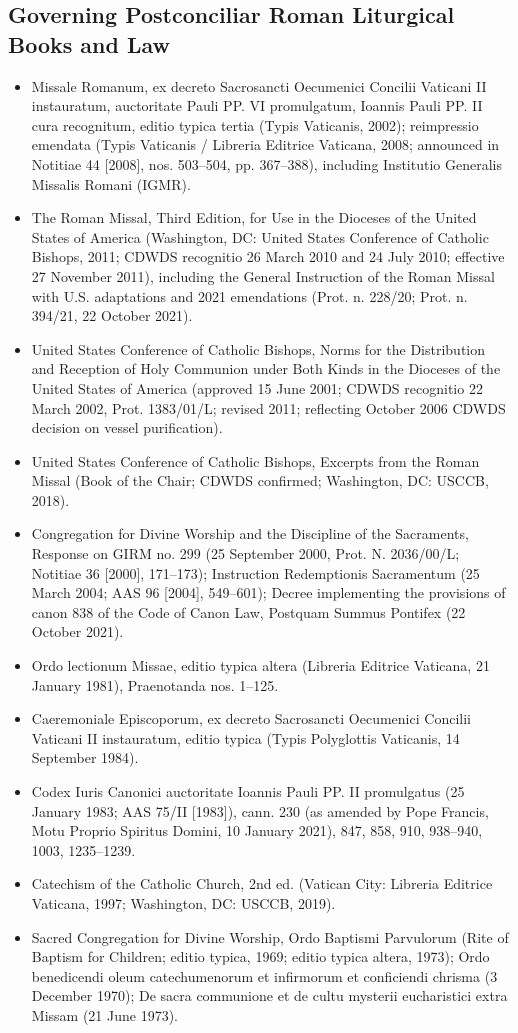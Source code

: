 \subsection*{Governing Postconciliar Roman Liturgical Books and Law}
\begin{itemize}
\item Missale Romanum, ex decreto Sacrosancti Oecumenici Concilii Vaticani II instauratum, auctoritate Pauli PP. VI promulgatum, Ioannis Pauli PP. II cura recognitum, editio typica tertia (Typis Vaticanis, 2002); reimpressio emendata (Typis Vaticanis / Libreria Editrice Vaticana, 2008; announced in Notitiae 44 [2008], nos. 503--504, pp. 367--388), including Institutio Generalis Missalis Romani (IGMR).
\item The Roman Missal, Third Edition, for Use in the Dioceses of the United States of America (Washington, DC: United States Conference of Catholic Bishops, 2011; CDWDS recognitio 26 March 2010 and 24 July 2010; effective 27 November 2011), including the General Instruction of the Roman Missal with U.S. adaptations and 2021 emendations (Prot. n. 228/20; Prot. n. 394/21, 22 October 2021).
\item United States Conference of Catholic Bishops, Norms for the Distribution and Reception of Holy Communion under Both Kinds in the Dioceses of the United States of America (approved 15 June 2001; CDWDS recognitio 22 March 2002, Prot. 1383/01/L; revised 2011; reflecting October 2006 CDWDS decision on vessel purification).
\item United States Conference of Catholic Bishops, Excerpts from the Roman Missal (Book of the Chair; CDWDS confirmed; Washington, DC: USCCB, 2018).
\item Congregation for Divine Worship and the Discipline of the Sacraments, Response on GIRM no. 299 (25 September 2000, Prot. N. 2036/00/L; Notitiae 36 [2000], 171--173); Instruction Redemptionis Sacramentum (25 March 2004; AAS 96 [2004], 549--601); Decree implementing the provisions of canon 838 of the Code of Canon Law, Postquam Summus Pontifex (22 October 2021).
\item Ordo lectionum Missae, editio typica altera (Libreria Editrice Vaticana, 21 January 1981), Praenotanda nos. 1--125.
\item Caeremoniale Episcoporum, ex decreto Sacrosancti Oecumenici Concilii Vaticani II instauratum, editio typica (Typis Polyglottis Vaticanis, 14 September 1984).
\item Codex Iuris Canonici auctoritate Ioannis Pauli PP. II promulgatus (25 January 1983; AAS 75/II [1983]), cann. 230 (as amended by Pope Francis, Motu Proprio Spiritus Domini, 10 January 2021), 847, 858, 910, 938--940, 1003, 1235--1239.
\item Catechism of the Catholic Church, 2nd ed. (Vatican City: Libreria Editrice Vaticana, 1997; Washington, DC: USCCB, 2019).
\item Sacred Congregation for Divine Worship, Ordo Baptismi Parvulorum (Rite of Baptism for Children; editio typica, 1969; editio typica altera, 1973); Ordo benedicendi oleum catechumenorum et infirmorum et conficiendi chrisma (3 December 1970); De sacra communione et de cultu mysterii eucharistici extra Missam (21 June 1973).
\end{itemize}
